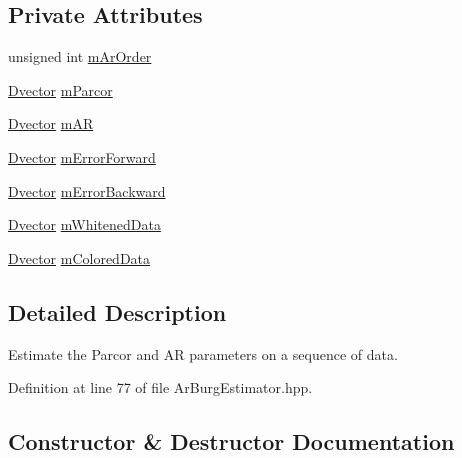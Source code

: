 \subsection*{Private Attributes}
\begin{DoxyCompactItemize}
\item 
unsigned int \hyperlink{classtsa_1_1_ar_burg_estimator_a918baccfeb2101848018b6abcf1e9b19}{m\+Ar\+Order}
\item 
\hyperlink{namespacetsa_a8900fb03d849baf447a1a0efe2561fb2}{Dvector} \hyperlink{classtsa_1_1_ar_burg_estimator_a51cbda2be55098f65e4d710cfe1153b7}{m\+Parcor}
\item 
\hyperlink{namespacetsa_a8900fb03d849baf447a1a0efe2561fb2}{Dvector} \hyperlink{classtsa_1_1_ar_burg_estimator_a6d0a5657630ecd64c33761a8f0c835e1}{m\+AR}
\item 
\hyperlink{namespacetsa_a8900fb03d849baf447a1a0efe2561fb2}{Dvector} \hyperlink{classtsa_1_1_ar_burg_estimator_a3ff0b47d541f89567d177a42103a95a2}{m\+Error\+Forward}
\item 
\hyperlink{namespacetsa_a8900fb03d849baf447a1a0efe2561fb2}{Dvector} \hyperlink{classtsa_1_1_ar_burg_estimator_abe77e4f47e6eb9e1f39e22f99331c981}{m\+Error\+Backward}
\item 
\hyperlink{namespacetsa_a8900fb03d849baf447a1a0efe2561fb2}{Dvector} \hyperlink{classtsa_1_1_ar_burg_estimator_a3d033517e7242d079e14038dcd50556c}{m\+Whitened\+Data}
\item 
\hyperlink{namespacetsa_a8900fb03d849baf447a1a0efe2561fb2}{Dvector} \hyperlink{classtsa_1_1_ar_burg_estimator_a7b50a6b230b2236500f54f9561d9ef7d}{m\+Colored\+Data}
\end{DoxyCompactItemize}


\subsection{Detailed Description}
Estimate the Parcor and AR parameters on a sequence of data. 

Definition at line 77 of file Ar\+Burg\+Estimator.\+hpp.



\subsection{Constructor \& Destructor Documentation}
\mbox{\label{classtsa_1_1_ar_burg_estimator_a6204df3016ce1f4aabf95fe4e05b27c4}} 
